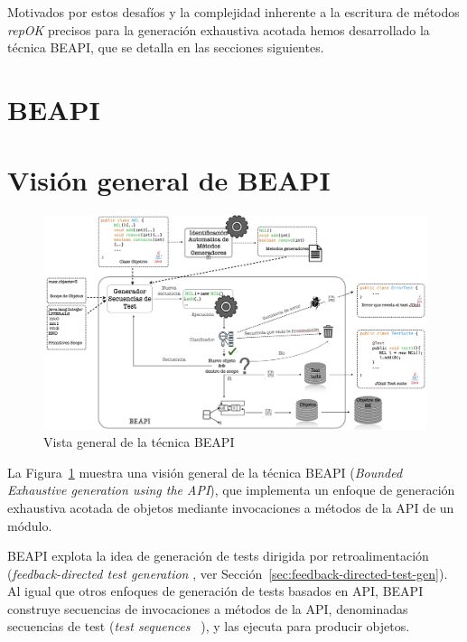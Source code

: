 Motivados por estos desafíos y la complejidad inherente a la escritura de
métodos \emph{repOK} precisos para la generación exhaustiva acotada hemos
desarrollado la técnica BEAPI, que se detalla en las secciones siguientes.

\section[BEAPI]{BEAPI}
\label{sec:beapiIntro}

\section{Visión general de BEAPI}
\label{sec:beapi-overview}

\begin{figure}[H]
  \centering
  \includegraphics[width=1.0\textwidth]{images/beapi-arquitecture.jpeg}
  \caption{Vista general de la técnica \textsf{BEAPI}}
  \label{fig:beapi-overview}
\end{figure}

La Figura~\ref{fig:beapi-overview} muestra una visión general de la técnica 
\textsf{BEAPI} (\emph{Bounded Exhaustive generation using the API}), que implementa un enfoque 
de generación exhaustiva acotada de objetos mediante invocaciones a métodos de
la API de un módulo. 






\textsf{BEAPI} explota la idea de generación de tests dirigida por retroalimentación 
(\emph{feedback-directed test generation} \cite{} , ver Sección~\ref{sec:feedback-directed-test-gen}). 
Al igual que otros enfoques de generación de tests basados en API, 
\textsf{BEAPI} construye secuencias de invocaciones a métodos de la API,
denominadas secuencias de test (\emph{test sequences}~ \cite{} ),
y las ejecuta para producir objetos.

